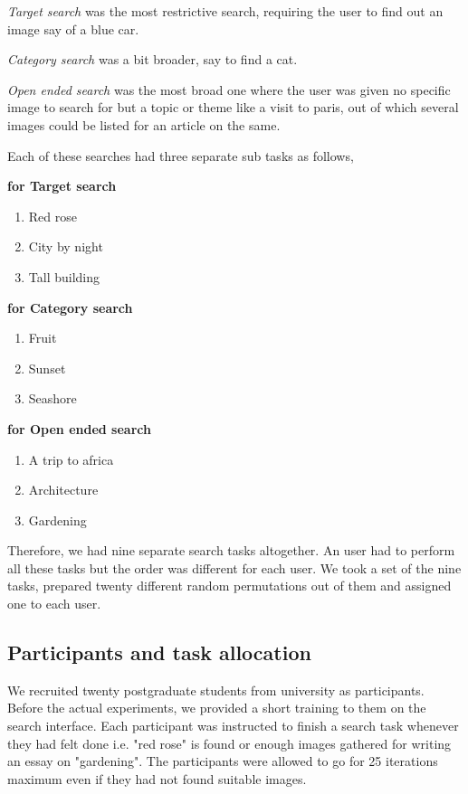 \documentclass[english]{tktltiki}
\begin{document}
\textit{Target search} was the most restrictive search, requiring the user to find out an image say of a blue car.

\textit{Category search} was a bit broader, say to find a cat.

\textit{Open ended search} was the most broad one where the user was given no specific image to search for but a topic or theme like a visit to paris, out of which several images could be listed for an article on the same.

Each of these searches had three separate sub tasks as follows,

\textbf{for Target search}

\begin{enumerate}
  \item Red rose
  \item City by night
  \item Tall building
\end{enumerate}

\textbf{for Category search}

\begin{enumerate}
  \item Fruit
  \item Sunset
  \item Seashore
\end{enumerate}

\textbf{for Open ended search}

\begin{enumerate}
  \item A trip to africa
  \item Architecture
  \item Gardening
\end{enumerate}

Therefore, we had nine separate search tasks altogether. An user had to perform all these tasks but the order was different for each user. We took a set of the nine tasks, prepared twenty different random permutations out of them and assigned one to each user.

\subsection{Participants and task allocation}

We recruited twenty postgraduate students from university as participants. Before the actual experiments, we provided a short training to them on the search interface. Each participant was instructed to finish a search task whenever they had felt done i.e. "red rose" is found or enough images gathered for writing an essay on "gardening". The participants were allowed to go for 25 iterations maximum even if they had not found suitable images.
\end{document}
